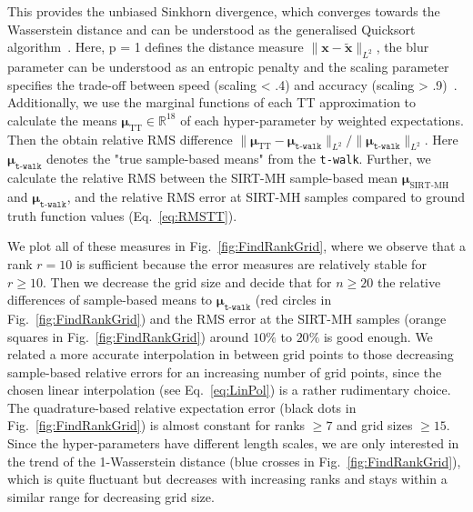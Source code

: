 This provides the unbiased Sinkhorn divergence, which converges towards the Wasserstein distance and can be understood as the generalised Quicksort algorithm~\cite{feydy2020OT}.
Here, p = 1 defines the distance measure $\lVert \bm{x} -\tilde{\bm{x}} \rVert_{L^2}$, the blur parameter can be understood as an entropic penalty and the scaling parameter specifies the trade-off between speed (scaling < .4) and accuracy (scaling > .9)~\cite{Wassersteinaccess}.
Additionally, we use the marginal functions of each TT approximation to calculate the means $\bm{\mu}_{\text{TT}} \in \mathbb{R}^{18}$ of each hyper-parameter by weighted expectations.
Then the obtain relative RMS difference $\lVert\bm{\mu}_{\text{TT}} - \bm{\mu}_{\texttt{t-walk}} \rVert_{L^2} / \lVert \bm{\mu}_{\texttt{t-walk}} \rVert_{L^2} $.
Here $\bm{\mu}_{\texttt{t-walk}}$ denotes the "true sample-based means" from the \texttt{t-walk}.
Further, we calculate the relative RMS between the SIRT-MH sample-based mean $\bm{\mu}_{\text{SIRT-MH}}$ and $\bm{\mu}_{\texttt{t-walk}}$, and the relative RMS error at SIRT-MH samples compared to ground truth function values (Eq.~\ref{eq:RMSTT}).

We plot all of these measures in Fig.~\ref{fig:FindRankGrid}, where we observe that a rank $r = 10$ is sufficient because the error measures are relatively stable for $r\geq10$.
Then we decrease the grid size and decide that for $n \geq 20$ the relative differences of sample-based means to $\bm{\mu}_{\texttt{t-walk}}$ (red circles in Fig.~\ref{fig:FindRankGrid}) and the RMS error at the SIRT-MH samples (orange squares in Fig.~\ref{fig:FindRankGrid}) around $10 \%$ to $ 20\%$ is good enough.
We related a more accurate interpolation in between grid points to those decreasing sample-based relative errors for an increasing number of grid points, since the chosen linear interpolation (see Eq.~\ref{eq:LinPol}) is a rather rudimentary choice.
The quadrature-based relative expectation error (black dots in Fig.~\ref{fig:FindRankGrid}) is almost constant for ranks $\geq 7$ and grid sizes $\geq15$.
Since the hyper-parameters have different length scales, we are only interested in the trend of the 1-Wasserstein distance (blue crosses in Fig.~\ref{fig:FindRankGrid}), which is quite fluctuant but decreases with increasing ranks and stays within a similar range for decreasing grid size.


